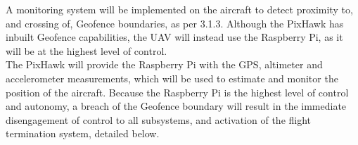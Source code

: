 A monitoring system will be implemented on the aircraft to detect proximity to, and crossing of, Geofence boundaries, as per 3.1.3. Although the PixHawk has inbuilt Geofence capabilities, the UAV will instead use the Raspberry Pi, as it will be at the highest level of control.\\

The PixHawk will provide the Raspberry Pi with the GPS, altimeter and accelerometer measurements, which will be used to estimate and monitor the position of the aircraft. Because the Raspberry Pi is the highest level of control and autonomy, a breach of the Geofence boundary will result in the immediate disengagement of control to all subsystems, and activation of the flight termination system, detailed below.
